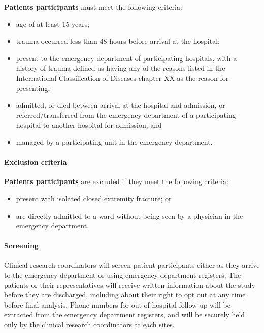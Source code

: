 \documentclass[
]{scrartcl}
\let\oldparagraph\paragraph
\renewcommand{\paragraph}[1]{\oldparagraph{#1}\mbox{}}
\providecommand{\tightlist}{%
  \setlength{\itemsep}{0pt}\setlength{\parskip}{0pt}}\usepackage{longtable,booktabs,array}
\begin{document}
\textbf{Patients participants} must meet the following criteria:

\begin{itemize}
\tightlist
\item
  age of at least 15 years;
\item
  trauma occurred less than 48 hours before arrival at the hospital;
\item
  present to the emergency department of participating hospitals, with a
  history of trauma defined as having any of the reasons listed in the
  International Classification of Diseases chapter XX as the reason for
  presenting;
\item
  admitted, or died between arrival at the hospital and admission, or
  referred/transferred from the emergency department of a participating
  hospital to another hospital for admission; and
\item
  managed by a participating unit in the emergency department.
\end{itemize}

\hypertarget{exclusion-criteria-1}{%
\paragraph{Exclusion criteria}\label{exclusion-criteria-1}}

\textbf{Patients participants} are excluded if they meet the following
criteria:

\begin{itemize}
\tightlist
\item
  present with isolated closed extremity fracture; or
\item
  are directly admitted to a ward without being seen by a physician in
  the emergency department.
\end{itemize}

\hypertarget{screening-1}{%
\paragraph{Screening}\label{screening-1}}

Clinical research coordinators will screen patient participants either
as they arrive to the emergency department or using emergency department
registers. The patients or their representatives will receive written
information about the study before they are discharged, including about
their right to opt out at any time before final analysis. Phone numbers
for out of hospital follow up will be extracted from the emergency
department registers, and will be securely held only by the clinical
research coordinators at each sites.
\end{document}
